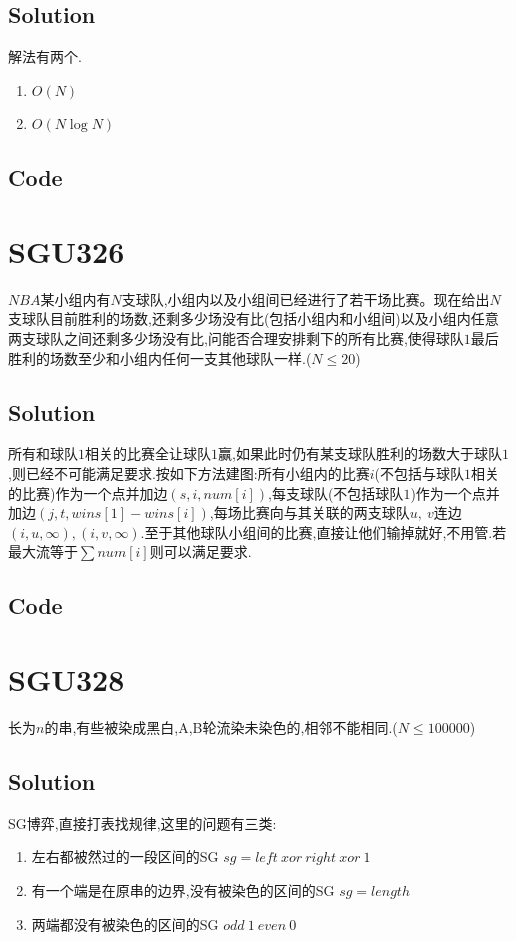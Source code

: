 \documentclass{article}
\newcommand{\includecode}[2][c]{}
\begin{document}
\begin{flushleft}
\subsection{Solution}
解法有两个.
\begin{enumerate}
\item $O(N)$

\item $O(N\log{N})$
\end{enumerate}
\subsection{Code}
\includecode[C++]{325.cc}

\section{SGU326}
$NBA$某小组内有$N$支球队,小组内以及小组间已经进行了若干场比赛。现在给出$N$支球队目前胜利的场数,还剩多少场没有比(包括小组内和小组间)以及小组内任意两支球队之间还剩多少场没有比,问能否合理安排剩下的所有比赛,使得球队$1$最后胜利的场数至少和小组内任何一支其他球队一样.($N \leq 20$)
\subsection{Solution}
所有和球队$1$相关的比赛全让球队$1$赢,如果此时仍有某支球队胜利的场数大于球队$1$,则已经不可能满足要求.按如下方法建图:所有小组内的比赛$i$(不包括与球队$1$相关的比赛)作为一个点并加边$(s, i,num[i])$,每支球队(不包括球队$1$)作为一个点并加边$(j, t, wins[1]-wins[i])$,每场比赛向与其关联的两支球队$u,\ v$连边$(i, u, \infty), (i, v, \infty)$.至于其他球队小组间的比赛,直接让他们输掉就好,不用管.若最大流等于$\sum num[i]$则可以满足要求.
\subsection{Code}
\includecode[C++]{326.cc}

\section{SGU328}
长为$n$的串,有些被染成黑白,A,B轮流染未染色的,相邻不能相同.($N \leq 100000$)\\
\subsection{Solution}
SG博弈,直接打表找规律,这里的问题有三类:
\begin{enumerate}
\item 左右都被然过的一段区间的SG $sg = left\ xor\ right\ xor\ 1$
\item 有一个端是在原串的边界,没有被染色的区间的SG $sg = length$
\item 两端都没有被染色的区间的SG $odd\ 1\ even\ 0$
\end{enumerate}

\end{flushleft}
\end{document}
